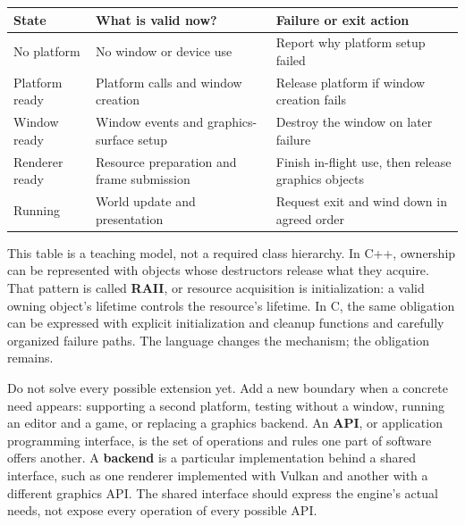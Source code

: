 {\def\LTcaptype{none} %
\begin{longtable}[]{@{}
  >{\raggedright\arraybackslash}p{}
  >{\raggedright\arraybackslash}p{}
  >{\raggedright\arraybackslash}p{}@{}}
\toprule\noalign{}
\begin{minipage}[b]{\linewidth}\raggedright
State
\end{minipage} & \begin{minipage}[b]{\linewidth}\raggedright
What is valid now?
\end{minipage} & \begin{minipage}[b]{\linewidth}\raggedright
Failure or exit action
\end{minipage} \\
\midrule\noalign{}
\endhead
\bottomrule\noalign{}
\endlastfoot
No platform & No window or device use & Report why platform setup failed \\
Platform ready & Platform calls and window creation & Release platform if window creation fails \\
Window ready & Window events and graphics-surface setup & Destroy the window on later failure \\
Renderer ready & Resource preparation and frame submission & Finish in-flight use, then release graphics objects \\
Running & World update and presentation & Request exit and wind down in agreed order \\
\end{longtable}
}

This table is a teaching model, not a required class hierarchy. In C++, ownership can be represented with objects whose destructors release what they acquire. That pattern is called \textbf{RAII}, or resource acquisition is initialization: a valid owning object's lifetime controls the resource's lifetime. In C, the same obligation can be expressed with explicit initialization and cleanup functions and carefully organized failure paths. The language changes the mechanism; the obligation remains.

Do not solve every possible extension yet. Add a new boundary when a concrete need appears: supporting a second platform, testing without a window, running an editor and a game, or replacing a graphics backend. An \textbf{API}, or application programming interface, is the set of operations and rules one part of software offers another. A \textbf{backend} is a particular implementation behind a shared interface, such as one renderer implemented with Vulkan and another with a different graphics API. The shared interface should express the engine's actual needs, not expose every operation of every possible API.

